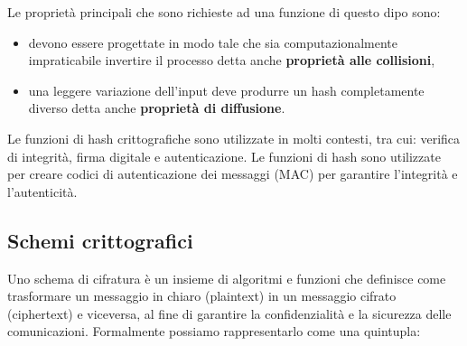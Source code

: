 \begin{figure}[h!]
    \centering
\end{figure}

\vspace{0.2cm}
\noindent
Le proprietà principali che sono richieste ad una funzione di questo dipo sono: 
\begin{itemize}
    \item devono essere progettate in modo tale che sia computazionalmente impraticabile invertire il processo detta anche \textbf{proprietà alle collisioni}, 
    \item una leggere variazione dell'input deve produrre un hash completamente diverso detta anche \textbf{proprietà di diffusione}.
\end{itemize}

Le funzioni di hash crittografiche sono utilizzate in molti contesti, tra cui: verifica di integrità, firma digitale e autenticazione.
Le funzioni di hash sono utilizzate per creare codici di autenticazione dei
messaggi (MAC) per garantire l'integrità e l'autenticità.

\subsection{Schemi crittografici}
Uno schema di cifratura è un insieme di algoritmi e funzioni che definisce come trasformare un messaggio in chiaro (plaintext) in un messaggio cifrato (ciphertext) e viceversa, al fine di garantire la confidenzialità e la sicurezza delle comunicazioni.
Formalmente possiamo rappresentarlo come una quintupla: 

